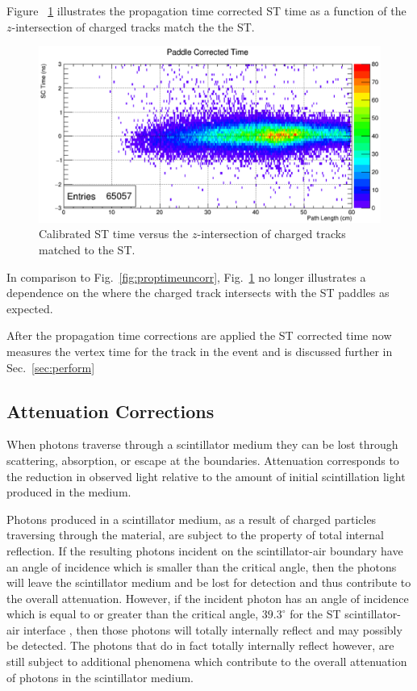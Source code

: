 Figure ~\ref{fig:proptimecorr} illustrates the propagation time corrected ST time as a function of the $z$-intersection of charged tracks match the the ST.
\begin{figure}[!htb]
	\centering
	\includegraphics[width=1.0\columnwidth]{performance/figs/prop_time_corr}
	\caption{Calibrated ST time versus the $z$-intersection of charged tracks matched to the ST.}
	\label{fig:proptimecorr}
\end{figure}
In comparison to Fig.~\ref{fig:proptimeuncorr}, Fig.~\ref{fig:proptimecorr} no longer illustrates a dependence on the where the charged track intersects with the ST paddles as expected.
	
After the propagation time corrections are applied the ST corrected time now measures the vertex time for the track in the event and is discussed further in Sec.~\ref{sec:perform}

\subsection{Attenuation Corrections} \label{sec:calib_ac}

When photons traverse through a scintillator medium they can be lost through scattering, absorption, or escape at the boundaries.  Attenuation corresponds to the reduction in observed light relative to the amount of initial scintillation light produced in the medium.

Photons produced in a scintillator medium, as a result of charged particles traversing through the material,  are subject to the property of total internal reflection.  If the resulting photons incident on the scintillator-air boundary have an angle of incidence which is smaller than the critical angle, then the photons will leave the scintillator medium and be lost for detection and thus contribute to the overall attenuation.  However, if the incident  photon has an angle of incidence which is equal to or greater than the critical angle, $39.3^{\circ}$ for the ST scintillator-air interface \cite{pooser16}, then those photons will totally internally reflect and may possibly be detected.  The photons that do in fact totally internally reflect however, are still subject to additional phenomena which contribute to the overall attenuation of photons in the scintillator medium.  

